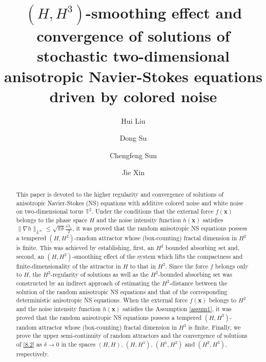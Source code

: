 \documentclass{elsarticle}
\theoremstyle{definition}
\numberwithin{equation}{section}
\begin{document}
\begin{frontmatter}

\title{   $(H,H^3)$-smoothing effect and convergence of solutions of  stochastic two-dimensional anisotropic Navier-Stokes equations driven by colored noise
}



\author[lh]{Hui Liu}


\author[sd]{Dong Su}


\author[scf]{Chengfeng Sun}

\author[xj]{Jie Xin}







\address[lh]{School of Mathematical Sciences, University of Jinan, Jinan 250022, PR China}
\address[sd]{School of Mathematics, Nanjing Audit University, Nanjing 211815, PR China}
\address[scf]{School of Applied Mathematics, Nanjing University of Finance and Economics, Nanjing 210023, PR China}
\address[xj]{School of Information Engineering, Shandong Youth University of Political Science, Jinan 250103, PR China}



\begin{abstract}

This paper is devoted to the higher regularity and convergence of solutions of anisotropic Navier-Stokes (NS) equations  with  additive colored noise and  white noise  on two-dimensional torus $\mathbb T^2$.  Under the conditions that the external force $f(\textbf{x})$ belongs to the phase space $ H$ and the noise intensity function $h(\textbf{x})$  satisfies $\|\nabla h\|_{L^\infty} \leq \sqrt{\pi\delta}  \frac{\nu \lambda_1}{2}$,  it was proved that the random anisotropic NS equations possess a tempered  $(H,H^2)$-random attractor  whose (box-counting) fractal  dimension in $H^2$ is finite. This was achieved by establishing, first, an $H^2$ bounded   absorbing set and, second,  an $(H,H^2)$-smoothing effect of the system which lifts the compactness and finite-dimensionality  of the attractor in $H$ to that in $H^2$.   Since the force $f$ belongs only to $H$, the $H^2$-regularity of solutions as well as the $H^2$-bounded absorbing set was constructed by an indirect approach of estimating the $H^2$-distance     between the solution  of the random anisotropic NS equations and that of the corresponding deterministic anisotropic NS equations. When the external force $f(\textbf{x})$  belongs to $H^2$ and the noise intensity function $h(\textbf{x})$ satisfies the Assumption \ref{assum1}, it was proved that the random anisotropic NS equations possess a tempered  $(H,H^3)$-random attractor  whose (box-counting) fractal  dimension in $H^3$ is finite. Finally, we prove the  upper semi-continuity of random attractors  and the convergence of solutions of \eqref{8.2}  as $\delta\rightarrow0$ in the spaces $(H,H)$, $(H,H^1)$, $(H^1,H^2)$ and $(H^2,H^3)$, respectively.
  \end{abstract}


\end{frontmatter}
\end{document}
